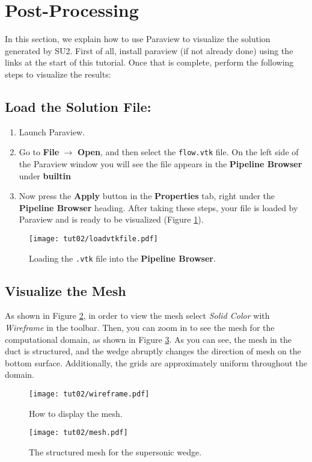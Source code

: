 \section{Post-Processing}
In this section, we explain how to use Paraview to visualize the solution generated by SU2. First of all, install paraview (if not already done) using the links at the start of this tutorial. Once that is complete, perform the following steps to visualize the results:
\subsection{Load the Solution File:}
\begin{enumerate}[label=\arabic*)]
	\item Launch Paraview.
	\item Go to \textbf{File} $\rightarrow$ \textbf{Open}, and then select the \texttt{flow.vtk} file. On the left side of the Paraview window you will see the file appears in the \textbf{Pipeline Browser} under \textbf{builtin}
	\item Now press the \textbf{Apply} button in the \textbf{Properties} tab, right under the \textbf{Pipeline Browser} heading. After taking these steps, your file is loaded by Paraview and is ready to be visualized (Figure \ref{fig2:load}).
\end{enumerate}
\begin{figure}[ht]
    \centering
    \texttt{[image: tut02/loadvtkfile.pdf]}
    \caption{Loading the \texttt{.vtk} file into the \textbf{Pipeline Browser}.}
    \label{fig2:load}
\end{figure}
\subsection{Visualize the Mesh}
As shown in Figure \ref{fig2:wireframe}, in order to view the mesh select \textit{Solid Color} with \textit{Wireframe} in the toolbar. Then, you can zoom in to see the mesh for the computational domain, as shown in Figure \ref{fig2:mesh}. As you can see, the mesh in the duct is structured, and the wedge abruptly changes the direction of mesh on the bottom surface. Additionally, the grids are approximately uniform throughout the domain.
\begin{figure}[ht]
    \centering
    \texttt{[image: tut02/wireframe.pdf]}
    \caption{How to display the mesh.}
    \label{fig2:wireframe}
\end{figure}
\begin{figure}[ht]
    \centering
    \texttt{[image: tut02/mesh.pdf]}
    \caption{The structured mesh for the supersonic wedge.}
    \label{fig2:mesh}
\end{figure}
